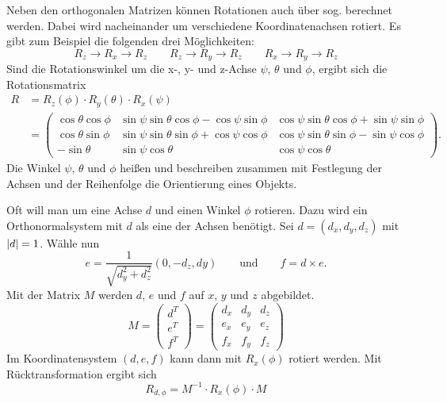Neben den orthogonalen Matrizen können Rotationen auch über sog.  berechnet werden.
Dabei wird nacheinander um verschiedene Koordinatenachsen rotiert.
Es gibt zum Beispiel die folgenden drei Möglichkeiten:
\[
  R_z \to R_x \to R_z \qquad
  R_z \to R_y \to R_z \qquad
  R_x \to R_y \to R_z
\]
Sind die Rotationswinkel um die x-, y- und z-Achse $\psi$, $\theta$ und $\phi$, ergibt sich die Rotationsmatrix
\begin{align*}
  R &= R_z(\phi) \cdot R_y(\theta) \cdot R_x(\psi) \\
  &=
  \begin{pmatrix}
    \cos\theta\cos\phi &
    \sin\psi\sin\theta\cos\phi-\cos\psi\sin\phi &
    \cos\psi\sin\theta\cos\phi+\sin\psi\sin\phi \\
    \cos\theta\sin\phi &
    \sin\psi\sin\theta\sin\phi+\cos\psi\cos\phi &
    \cos\psi\sin\theta\sin\phi-\sin\psi\cos\phi \\
    -\sin\theta &
    \sin\psi\cos\theta &
    \cos\psi\cos\theta
  \end{pmatrix}
  \text{.}
\end{align*}
Die Winkel $\psi$, $\theta$ und $\phi$ heißen  und beschreiben zusammen mit Festlegung der Achsen und der Reihenfolge die Orientierung eines Objekts.

Oft will man um eine Achse $d$ und einen Winkel $\phi$ rotieren.
Dazu wird ein Orthonormalsystem mit $d$ als eine der Achsen benötigt.
Sei $d = \left(d_x, d_y, d_z\right)$ mit $\vert d \vert = 1$.
Wähle nun \zB
\[
  e = \frac{1}{\sqrt{d_y^2+ d_z^2}}\left(0, -d_z, dy\right) \qquad \text{und} \qquad
  f = d \times e \text{.}
\]
Mit der Matrix $M$ werden $d$, $e$ und $f$ auf $x$, $y$ und $z$ abgebildet.
\[
  M =
  \begin{pmatrix}
    d^T \\
    e^T \\
    f^T
  \end{pmatrix}
  =
  \begin{pmatrix}
    d_x & d_y & d_z \\
    e_x & e_y & e_z \\
    f_x & f_y & f_z
  \end{pmatrix}
\]
Im Koordinatensystem $(d, e, f)$ kann dann mit $R_x(\phi)$ rotiert werden.
Mit Rücktransformation ergibt sich
\[
  R_{d,\phi} = M^{-1} \cdot R_x(\phi) \cdot M
\]


